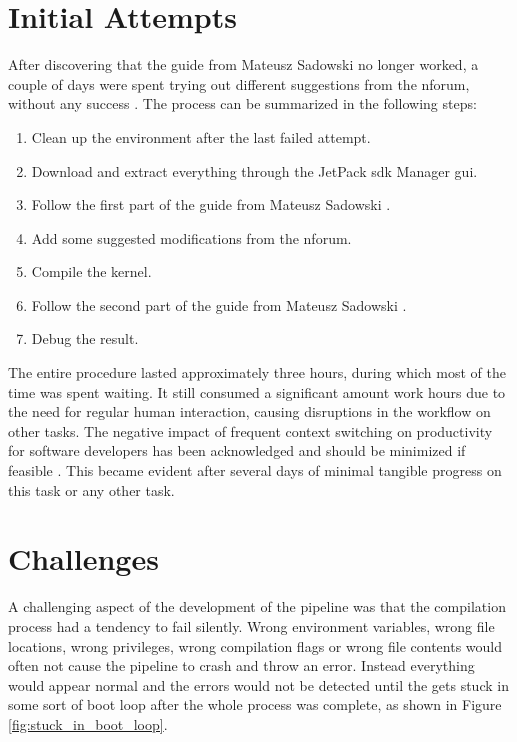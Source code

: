 \section{Initial Attempts}
After discovering that the guide from Mateusz Sadowski no longer worked, a couple of days were spent trying out different suggestions from the \gls{nforum}, without any success \cite{martensPortableSensorRig2022}.
The process can be summarized in the following steps:
\begin{enumerate}
    \item Clean up the environment after the last failed attempt.
    \item Download and extract everything through the JetPack \gls{sdk} Manager gui.
    \item Follow the first part of the guide from Mateusz Sadowski \cite{sadowskiEnablingPPSJetson2020}.
    \item Add some suggested modifications from the \gls{nforum}.
    \item Compile the kernel.
    \item Follow the second part of the guide from Mateusz Sadowski \cite{sadowskiEnablingPPSJetson2020}.
    \item Debug the result.
\end{enumerate}
The entire procedure lasted approximately three hours, during which most of the time was spent waiting.
It still consumed a significant amount work hours due to the need for regular human interaction, causing disruptions in the workflow on other tasks.
The negative impact of frequent context switching on productivity for software developers has been acknowledged and should be minimized if feasible \cite{meyerSoftwareDevelopersPerceptions2014}.
This became evident after several days of minimal tangible progress on this task or any other task.

\section{Challenges}
A challenging aspect of the development of the pipeline was that the compilation process had a tendency to fail silently.
Wrong environment variables, wrong file locations, wrong privileges, wrong compilation flags or wrong file contents would often not cause the pipeline to crash and throw an error.
Instead everything would appear normal and the errors would not be detected until the \jx gets stuck in some sort of boot loop after the whole process was complete, as shown in Figure \ref{fig:stuck_in_boot_loop}.

